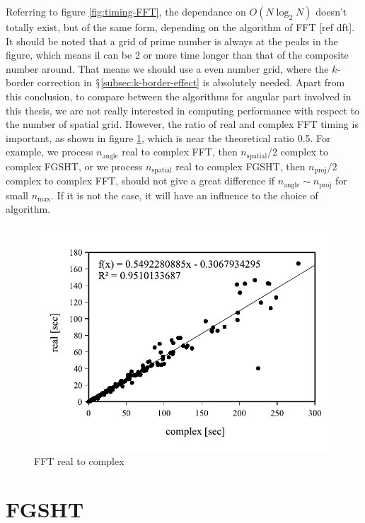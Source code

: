 Referring to figure \ref{fig:timing-FFT}, the dependance on $O(N\log_{2}N)$
\textcolor{red}{\scriptsize{}\citep{Numerical_Recipes_3ed}} doesn't
totally exist, but of the same form, depending on the algorithm of FFT
{[}ref dft{]}. It should be noted that a grid of prime number is always
at the peaks in the figure, which means il can be 2 or more time longer
than that of the composite number around. That means we should use
a even number grid, where the $k$-border correction in $\mathsection$\ref{subsec:k-border-effect}
is absolutely needed. Apart from this conclusion, to compare between
the algorithms for angular part involved in this thesis, we are not
really interested in computing performance with respect to the number
of spatial grid. However, the ratio of real and complex FFT timing
is important, as shown in figure \ref{fig:fft-real-to-complex}, which
is near the theoretical ratio 0.5. For example, we process $n_{\mathrm{angle}}$
real to complex FFT, then $n_{\mathrm{spatial}}/2$ complex to complex
FGSHT, or we process $n_{\mathrm{spatial}}$ real to complex FGSHT,
then $n_{\mathrm{proj}}/2$ complex to complex FFT, should not give
a great difference if $n_{\mathrm{angle}}\sim n_{\mathrm{proj}}$
for small $n_{\max}$. If it is not the case, it will have an influence
to the choice of algorithm.
\begin{center}
\begin{figure}[h]
\begin{centering}
\includegraphics[bb=0bp 20bp 340bp 235bp,width=0.5\columnwidth]{_figure/results/fftw_real_v_cmplx}
\par\end{centering}
\caption{FFT real to complex\label{fig:fft-real-to-complex}}
\end{figure}
\par\end{center}

\section{FGSHT}

